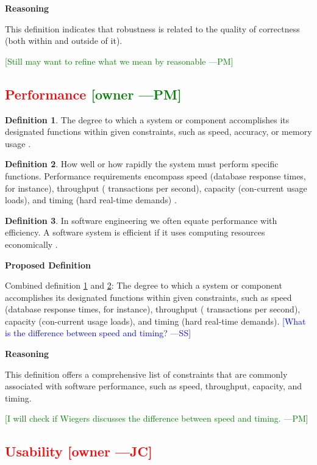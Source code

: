 \documentclass[letterpaper,cleveref]{lipics-v2019}
\newcommand{\authornote}[3]{\textcolor{#1}{[#3 ---#2]}}
\newcommand{\authornote}[3]{}
\newcommand{\wss}[1]{\authornote{blue}{SS}{#1}} %
\newcommand{\jc}[1]{\authornote{red}{JC}{#1}} %
\newcommand{\pmi}[1]{\authornote{green}{PM}{#1}} %
\newcommand{\notdone}[1]{\textcolor{red}{#1}}
\theoremstyle{definition}
\newtheorem{defn}{Definition}
\begin{document}
\noindent \textbf{Reasoning}

This definition indicates that robustness is related to the quality of
correctness (both within and outside of it). 

\pmi{Still may want to refine what we mean by reasonable}

\subsection{\notdone{Performance} \pmi{owner}}

\begin{defn} \label{PerformanceDefnSelected}
The degree to which a system or component accomplishes its designated functions
within given constraints, such as speed, accuracy, or memory usage
\citep{IEEEStdGlossarySET1990}.
\end{defn}
\begin{defn} \label{PerformanceDefnSelected2}
How well or how rapidly the system must perform specific functions. Performance
requirements encompass speed (database response times, for instance), throughput
( transactions per second), capacity (con-current usage loads), and timing (hard
real-time demands) \citep{wiegers2003softreq}.
\end{defn}
\begin{defn}
In software engineering we often equate performance with efficiency. A software
system is efficient if it uses computing resources economically
\citep{ghezzi1991fundamentals}.
\end{defn}

\noindent \textbf{Proposed Definition}

Combined definition \ref{PerformanceDefnSelected} and
\ref{PerformanceDefnSelected2}: The degree to which a system or component
accomplishes its designated functions within given constraints, such as speed
(database response times, for instance), throughput ( transactions per second),
capacity (con-current usage loads), and timing (hard real-time
demands). \wss{What is the difference between speed and timing?}

\noindent \textbf{Reasoning}

This definition offers a comprehensive list of constraints that are commonly associated with software performance, such as speed, throughput, capacity, and timing.

\pmi{I will check if Wiegers discusses the difference between speed and timing.}

\subsection{\notdone{Usability} \jc{owner}} 
\end{document}
